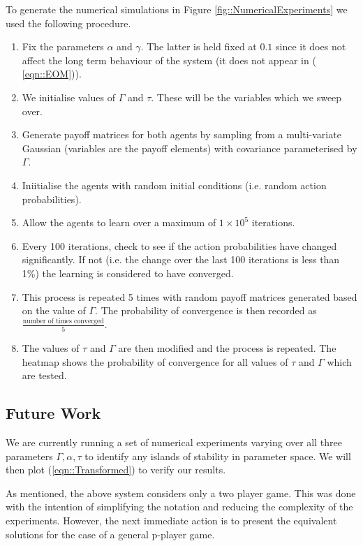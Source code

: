 \documentclass[.../main.tex]{subfiles}
\begin{document}
   To generate the numerical simulations in Figure \ref{fig::NumericalExperiments} we used the
   following procedure.

\begin{enumerate}
    \item Fix the parameters $\alpha$ and $\gamma$. The latter is held fixed at $0.1$ since
    it does not affect the long term behaviour of the system (it does not appear in (
    \ref{eqn::EOM})).
    \item We initialise values of $\Gamma$ and $\tau$. These will be the variables which we sweep
    over.
    \item Generate payoff matrices for both agents by sampling from a multi-variate Gaussian 
    (variables are the payoff elements) with covariance parameterised by $\Gamma$.
    \item Iniitialise the agents with random initial conditions (i.e. random action probabilities).
    \item Allow the agents to learn over a maximum of $1 \times 10^5$ iterations.
    \item Every 100 iterations, check to see if the action probabilities have changed significantly.
    If not (i.e. the change over the last 100 iterations is less than 1\%) the learning is
    considered to have converged.
    \item This process is repeated 5 times with random payoff matrices generated based on the value
    of $\Gamma$. The probability of convergence is then recorded as $\frac{\text{number of times
    converged}}{5}$.
    \item The values of $\tau$ and $\Gamma$ are then modified and the process is repeated. The
    heatmap shows the probability of convergence for all values of $\tau$ and $\Gamma$ which are
    tested.
\end{enumerate}


    \subsection*{Future Work} \label{sec::Future Work}

    We are currently running a set of numerical experiments varying over all three parameters
    $\Gamma, \alpha, \tau$ to identify any islands of stability in parameter space. We will then
    plot (\ref{eqn::Transformed}) to verify our results.

    As mentioned, the above system considers only a two player game. This was done with the intention
    of simplifying the notation and reducing the complexity of the experiments. However, the next
    immediate action is to present the equivalent solutions for the case of a general p-player game.
    
\end{document}
